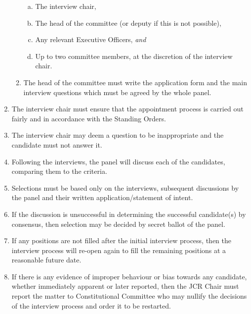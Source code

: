 \documentclass[12pt]{article}
\begin{document}
\begin{enumerate}
\begin{enumerate}
        \begin{enumerate}[(a)]
            \item The interview chair,
            \item The head of the committee (or deputy if this is not possible),
            \item Any relevant Executive Officers, \emph{and}
            \item Up to two committee members, at the discretion of the interview chair.
        \end{enumerate}
        \item The head of the committee must write the application form and the main interview questions which must be agreed by the whole panel.
    \end{enumerate}
    \item The interview chair must ensure that the appointment process is carried out fairly and in accordance with the Standing Orders.
    \item The interview chair may deem a question to be inappropriate and the candidate must not answer it.
    \item Following the interviews, the panel will discuss each of the candidates, comparing them to the criteria.
    \item Selections must be based only on the interviews, subsequent discussions by the panel and their written application/statement of intent.
    \item If the discussion is unsuccessful in determining the successful candidate(s) by consensus, then selection may be decided by secret ballot of the panel.
    \item If any positions are not filled after the initial interview process, then the interview process will re-open again to fill the remaining positions at a reasonable future date.
    \item If there is any evidence of improper behaviour or bias towards any candidate, whether immediately apparent or later reported, then the JCR Chair must report the matter to Constitutional Committee who may nullify the decisions of the interview process and order it to be restarted.
\end{enumerate}
\newpage
\end{document}

